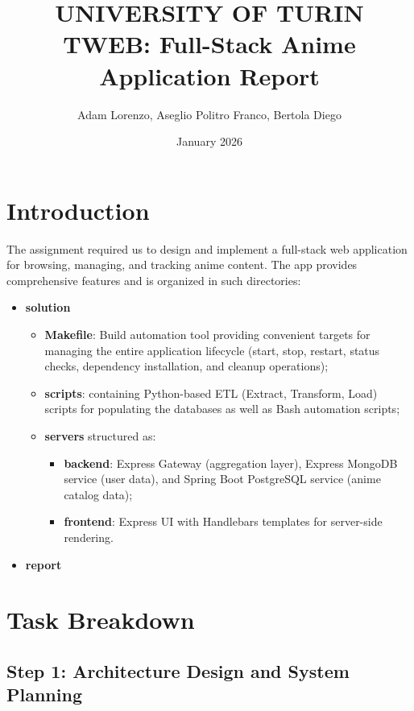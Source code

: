 \documentclass[11pt,a4paper]{article}
\title{UNIVERSITY OF TURIN \\TWEB: Full-Stack Anime Application Report}
\author{Adam Lorenzo, Aseglio Politro Franco, Bertola Diego}
\date{January 2026}
\begin{document}
\thispagestyle{empty}
\vspace*{4cm}
\tableofcontents
\newpage
{}



\section{Introduction}
The assignment required us to design and implement a full-stack web application for browsing, managing, and tracking anime content. The app provides comprehensive features and is organized in such directories:
\begin{itemize}
  \item \textbf{solution}
  \begin{itemize}
    \item \textbf{Makefile}: Build automation tool providing convenient targets for managing the entire application lifecycle (start, stop, restart, status checks, dependency installation, and cleanup operations);
    \item \textbf{scripts}: containing Python-based ETL (Extract, Transform, Load) scripts for populating the databases as well as Bash automation scripts;
    \item \textbf{servers} structured as:
    \begin{itemize}
      \item \textbf{backend}: Express Gateway (aggregation layer), Express MongoDB service (user data), and Spring Boot PostgreSQL service (anime catalog data);
      \item \textbf{frontend}: Express UI with Handlebars templates for server-side rendering.
    \end{itemize}
  \end{itemize}
  \item \textbf{report}
\end{itemize}





\section{Task Breakdown}
\subsection{Step 1: Architecture Design and System Planning}
\end{document}

